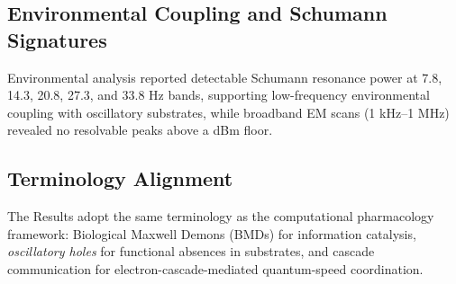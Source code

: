 \documentclass{article}
\theoremstyle{definition}
\theoremstyle{remark}
\begin{document}
\subsection{Environmental Coupling and Schumann Signatures}

Environmental analysis reported detectable Schumann resonance power at 7.8, 14.3, 20.8, 27.3, and 33.8 Hz bands, supporting low-frequency environmental coupling with oscillatory substrates, while broadband EM scans (1 kHz--1 MHz) revealed no resolvable peaks above a  dBm floor.

\subsection{Terminology Alignment}
The Results adopt the same terminology as the computational pharmacology framework: Biological Maxwell Demons (BMDs) for information catalysis, \emph{oscillatory holes} for functional absences in substrates, and cascade communication for electron-cascade-mediated quantum-speed coordination.
\end{document}

